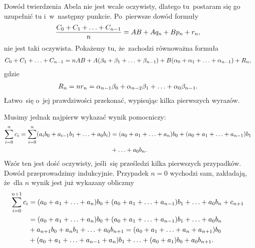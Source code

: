 \documentclass[a4paper,11pt]{article}
\begin{document}
\vspace{\spaceFour}


\start {} Dowód twierdzenia Abela nie jest wcale oczywisty,
dlatego tu~postaram się go uzupełnić tu i~w~następny punkcie.
Po~pierwsze dowód formuły
\begin{equation}
  \label{eq:Leja-14}
  \begin{split}
    \frac{ C_{ 0 } + C_{ 1 } + \ldots + C_{ n - 1 } }{ n } = AB + A q_{ n }
    + B p_{ n } + r_{ n },
  \end{split}
\end{equation}
nie jest taki oczywista. Pokażemy tu, że~zachodzi równoważna formuła
\begin{equation}
  \label{eq:Leja-15}
  \begin{split}
    C_{ 0 } + C_{ 1 } + \ldots + C_{ n - 1 } = n AB + A ( \beta_{ 0 } +
    \beta_{ 1 } + \ldots + \beta_{ n - 1 } ) + B ( \alpha_{ 0 } + \alpha_{ 1 } +
    \ldots + \alpha_{ n - 1 } ) + R_{ n },
  \end{split}
\end{equation}
gdzie
\begin{equation}
  \label{eq:Leja-16}
  \begin{split}
    R_{ n } = n r_{ n } = \alpha_{ n - 1 } \beta_{ 0 } + \alpha_{ n - 2 }
    \beta_{ 1 } + \ldots + \alpha_{ 0 } \beta_{ n - 1 }.
  \end{split}
\end{equation}
Łatwo~się o~jej prawdziwości przekonać, wypisując kilka pierwszych
wyrazów.

Musimy jednak najpierw wykazać wynik pomocniczy:
\begin{equation}
  \label{eq:Leja-17}
  \begin{split}
    \sum\limits_{ i = 0 }^{ n } c_{ i } = \sum\limits_{ i = 0 }^{ n } ( a_{ i } b_{
      0 } + a_{ i - 1 } b_{ 1 } + \ldots + a_{ 0 } b_{ i } ) &= ( a_{ 0 }
    + a_{ 1 } + \ldots + a_{ n } ) b_{ 0 } + ( a_{ 0 } + a_{ 1 }
    + \ldots + a_{ n - 1 } ) b_{ 1 } \\
    &+ \ldots + a_{ 0 } b_{ n }.
  \end{split}
\end{equation}
Wzór ten jest dość oczywisty, jeśli~się prześledzi kilka pierwszych
przypadków. Dowód przeprowadzimy indukcyjnie. Przypadek $n = 0$
wychodzi sam, zakładają, że~dla $n$ wynik jest już wykazany obliczmy
\begin{equation}
  \label{eq:Leja-18}
  \begin{split}
    \sum\limits_{ i = 0 }^{ n + 1 } c_{ i } &= ( a_{ 0 } + a_{ 1 } + \ldots +
    a_{ n } ) b_{ 0 } + ( a_{ 0 } + a_{ 1 } + \ldots + a_{ n - 1 } ) b_{
      1 } + \ldots
    + a_{ 0 } b_{ n } + c_{ n + 1 } \\
    &= ( a_{ 0 } + a_{ 1 } + \ldots + a_{ n } ) b_{ 0 } + ( a_{ 0 } + a_{
      1 }
    + \ldots + a_{ n - 1 } ) b_{ 1 } + \ldots + a_{ 0 } b_{ n } \\
    &+ a_{ n + 1 } b_{ 0 } + a_{ n } b_{ 1 } + \ldots + a_{ 0 } b_{ n + 1
    }
    = ( a_{ 0 } + a_{ 1 } + \ldots + a_{ n } + a_{ n + 1 } ) b_{ 0 } \\
    &+ ( a_{ 0 } + a_{ 1 } + \ldots + a_{ n - 1 } + a_{ n } ) b_{ 1 } +
    \ldots + ( a_{ 0 } + a_{ 1 } ) b_{ 0 } + a_{ 0 } b_{ n + 1 }.
  \end{split}
\end{equation}
\end{document}
